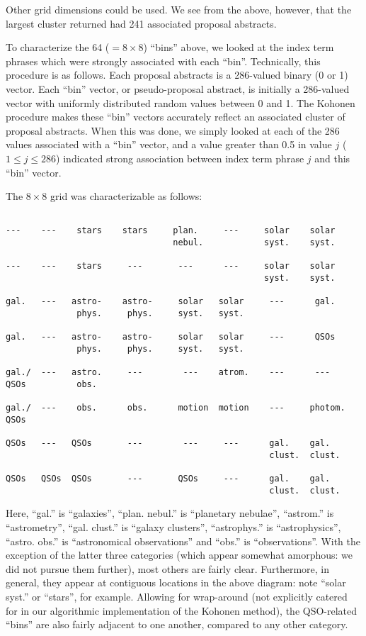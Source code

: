 Other grid dimensions could be used.  We see from the above, however, that
the largest cluster returned had 241 associated proposal abstracts.

To characterize the 64 ($= 8 \times 8$) ``bins'' above, we looked at the 
index term phrases which were strongly associated with each ``bin''.  
Technically, this procedure is as follows.  Each proposal abstracts is a
286-valued binary (0 or 1) vector.  Each ``bin'' vector, or pseudo-proposal
abstract, is initially a 286-valued vector with uniformly distributed random
values between 0 and 1.  The Kohonen procedure makes these ``bin'' vectors
accurately reflect an associated cluster of proposal abstracts.  When this
was done, we simply looked at each of the 286 values associated with a 
``bin'' vector, and a value greater than 0.5 in value $j$ ($1 \leq j \leq 
286$) indicated strong association between index term phrase $j$ and this 
``bin'' vector. 

The $8 \times 8$ grid was characterizable as follows:


\begin{verbatim}

---    ---    stars    stars     plan.     ---     solar    solar
                                 nebul.            syst.    syst.

---    ---    stars     ---       ---      ---     solar    solar
                                                   syst.    syst.

gal.   ---   astro-    astro-     solar   solar     ---      gal. 
              phys.     phys.     syst.   syst. 

gal.   ---   astro-    astro-     solar   solar     ---      QSOs
              phys.     phys.     syst.   syst.

gal./  ---   astro.     ---        ---    atrom.    ---      ---
QSOs          obs.

gal./  ---    obs.      obs.      motion  motion    ---     photom.
QSOs

QSOs   ---   QSOs       ---        ---     ---      gal.    gal.
                                                    clust.  clust.

QSOs   QSOs  QSOs       ---       QSOs     ---      gal.    gal.
                                                    clust.  clust.

\end{verbatim}

Here, ``gal.'' is ``galaxies'', ``plan. nebul.'' is ``planetary nebulae'',
``astrom.'' is ``astrometry'', ``gal. clust.'' is ``galaxy clusters'',
``astrophys.'' is ``astrophysics'', ``astro. obs.'' is ``astronomical 
observations'' and ``obs.'' is ``observations''.  With the exception 
of the latter three categories (which appear somewhat amorphous: we did
not pursue them further), most others are fairly clear.  
Furthermore, in general, they appear at contiguous locations in the
above diagram: note ``solar syst.'' or ``stars'', for example.  Allowing
for wrap-around (not explicitly catered for in our algorithmic 
implementation of the Kohonen method), the QSO-related ``bins'' are  also 
fairly adjacent to one another, compared to any other category.

